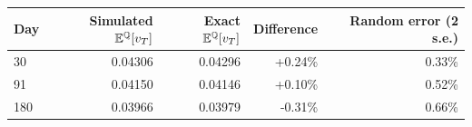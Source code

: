 \begin{tabular}{@{}lrrrr@{}}
\toprule
\textbf{Day} & \textbf{Simulated $\mathbb{E}^{\mathbb{Q}}[v_T]$} & \textbf{Exact $\mathbb{E}^{\mathbb{Q}}[v_T]$} & \textbf{Difference} & \textbf{Random error (2 s.e.)}\\
\midrule
30 & 0.04306 & 0.04296 & +0.24\% & 0.33\% \\
91 & 0.04150 & 0.04146 & +0.10\% & 0.52\% \\
180 & 0.03966 & 0.03979 & -0.31\% & 0.66\% \\
\bottomrule
\end{tabular}

